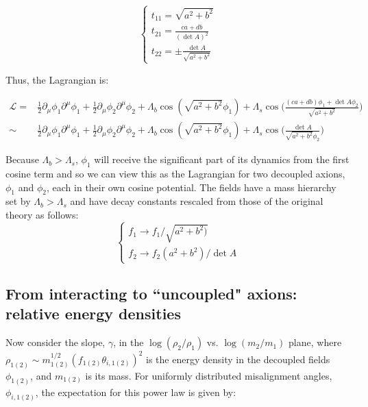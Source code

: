 \documentclass[11pt]{article}
\begin{document}
\begin{equation}
    \begin{cases}
        t_{11} = \sqrt{a^2+b^2} \\
        t_{21} = \frac{ca+db}{(\det{A})^2} \\
        t_{22} = \pm \frac{\det{A}}{\sqrt{a^2+b^2}}
    \end{cases}
\end{equation}

Thus, the Lagrangian is:

\begin{align*}
   \mathcal{L} = &  \frac{1}{2}\partial_\mu\phi_1\partial^\mu\phi_1+\frac{1}{2}\partial_\mu\phi_2\partial^\mu\phi_2+\Lambda_b\cos{(\sqrt{a^2+b^2}\phi_1)}+\Lambda_s\cos{\bigg(\frac{(ca+db)\phi_1+\det{A}\phi_2}{\sqrt{a^2+b^2}}\bigg)} \\
   \sim & \frac{1}{2}\partial_\mu\phi_1\partial^\mu\phi_1+\frac{1}{2}\partial_\mu\phi_2\partial^\mu\phi_2+\Lambda_b\cos{(\sqrt{a^2+b^2}\phi_1)}+\Lambda_s\cos{\bigg(\frac{\det{A}}{\sqrt{a^2+b^2}\phi_2}\bigg)}
\end{align*}

Because $\Lambda_b>\Lambda_s$, $\phi_1$ will receive the significant part of its dynamics from the first cosine term and so we can view this as the Lagrangian for two decoupled axions, $\phi_1$ and $\phi_2$, each in their own cosine potential. The fields have a mass hierarchy set by $\Lambda_b>\Lambda_s$ and have decay constants rescaled from those of the original theory as follows:
\begin{equation}
    \label{eq:decay-consts-GS}
    \begin{cases}
        f_1 \rightarrow f_1/\sqrt{a^2+b^2)} \\
        f_2 \rightarrow f_2(a^2+b^2)/\det{A}
    \end{cases}
\end{equation}

\subsection{From interacting to ``uncoupled" axions: relative energy densities}
\label{subsec:GS-powerlaw}
Now consider the slope, $\gamma$, in the $\log{(\rho_2/\rho_1)}$ vs. $\log{(m_2/m_1)}$ plane, where $\rho_{1(2)}\sim m_{1(2)}^{1/2}(f_{1(2)}\theta_{i,1(2)})^2$ is the energy density in the decoupled fields $\phi_{1(2)}$, and $m_{1(2)}$ is its mass. For uniformly distributed misalignment angles, $\phi_{i,1(2)}$, the expectation for this power law is given by:
\end{document}
